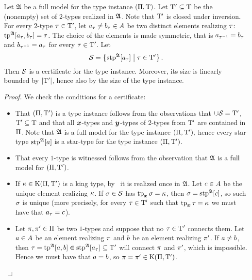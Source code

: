 \begin{lemma}\label{lem:cert-extract}
Let $\mathfrak{A}$ be a full model for the type instance $(\Pi,\mathrm{T})$.
Let ${\mathrm{T}'} \subseteq \mathrm{T}$ be the (nonempty) set of $2$-types realized in
$\mathfrak{A}$. Note that ${\mathrm{T}'}$ is closed under inversion. 
For every $2$-type $\tau \in {\mathrm{T}'}$,
let $a_{\tau} \neq b_{\tau} \in A$ be two distinct elements realizing
$\tau$: $\operatorname{tp}^{\mathfrak{A}}[a_{\tau},b_{\tau}] = \tau$. The choice of the
elements is made symmetric, that is $a_{\tau^{-1}} = b_{\tau}$ and
$b_{\tau^{-1}} = a_{\tau}$ for every $\tau\in{\mathrm{T}'}$.
Let 
\[
  \mathcal{S} = \left\{\operatorname{stp}^{\mathfrak{A}}[a_{\tau}]\mathrel{}\middle|\mathrel{}\tau\in{\mathrm{T}'}\right\}.
\]
Then $\mathcal{S}$ is a certificate for the type instance. Moreover, its size is
linearly bounded by $\left|{\mathrm{T}'}\right|$, hence also by the size of the type
instance.
\end{lemma}
\begin{proof}
We check the conditions for a certificate:
\begin{itemize}
  \item[\refcertcond1] That $(\Pi,{\mathrm{T}'})$ is a type instance follows from
  the observations that $\cup\mathcal{S} = {\mathrm{T}'}$, ${\mathrm{T}'} \subseteq \mathrm{T}$ and that all $\bm{x}$-types
  and $\bm{y}$-types of $2$-types from ${\mathrm{T}'}$ are contained in $\Pi$. Note that
  $\mathfrak{A}$ is a full model for the type instance $(\Pi,{\mathrm{T}'})$, hence every
  star-type $\operatorname{stp}^{\mathfrak{A}}[a]$ is a star-type for the type instance
  $(\Pi,{\mathrm{T}'})$.
  \item[\refcertcond2] That every $1$-type is witnessed follows from the
  observation that $\mathfrak{A}$ is a full model for $(\Pi,{\mathrm{T}'})$.
  \item[\refcertcond3] If $\kappa \in \mathrm{K}(\Pi,{\mathrm{T}'})$ is a king type,
  by~ it is realized once in $\mathfrak{A}$.
  Let $c \in A$ be the unique element realizing $\kappa$.
  If $\sigma \in \mathcal{S}$ has $\operatorname{tp}_{\bm{x}}\sigma = \kappa$, then $\sigma = \operatorname{stp}^{\mathfrak{A}}[c]$,
  so such $\sigma$ is unique (more precisely, for every $\tau\in{\mathrm{T}'}$ such
  that $\operatorname{tp}_{\bm{x}}\tau = \kappa$ we must have that $a_{\tau} = c$).
  \item[\refcertcond4] Let $\pi, {\pi'} \in \Pi$ be two $1$-types and
  suppose that no $\tau\in{\mathrm{T}'}$ connects them. Let $a\in A$ be an element realizing
  $\pi$ and $b$ be an element realizing ${\pi'}$. If $a \neq b$, then
  $\tau = \operatorname{tp}^{\mathfrak{A}}[a,b] \in \operatorname{stp}^{\mathfrak{A}}[a_\tau] \subseteq {\mathrm{T}'}$ will
  connect $\pi$ and ${\pi'}$, which is impossible. Hence we must have that
  $a = b$, so $\pi = {\pi'} \in \mathrm{K}(\Pi,{\mathrm{T}'})$.
\end{itemize}
\end{proof}

